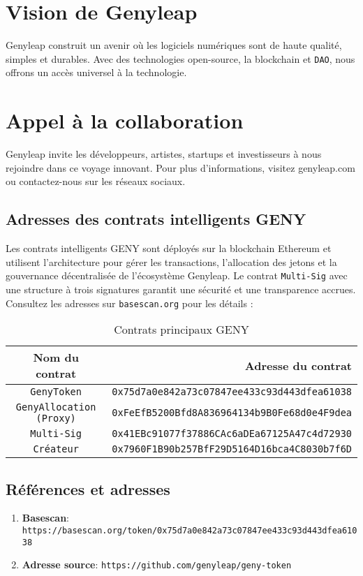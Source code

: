 \documentclass[a4paper,12pt,openany]{book}
\begin{document}
\chapter{Vision de Genyleap}
Genyleap construit un avenir où les logiciels numériques sont de haute qualité, simples et durables. Avec des technologies open-source, la blockchain et \texttt{DAO}, nous offrons un accès universel à la technologie.

\chapter{Appel à la collaboration}
Genyleap invite les développeurs, artistes, startups et investisseurs à nous rejoindre dans ce voyage innovant. Pour plus d'informations, visitez genyleap.com ou contactez-nous sur les réseaux sociaux.

\section*{Adresses des contrats intelligents GENY}
Les contrats intelligents GENY sont déployés sur la blockchain Ethereum et utilisent l'architecture  pour gérer les transactions, l'allocation des jetons et la gouvernance décentralisée de l'écosystème Genyleap. Le contrat \texttt{Multi-Sig} avec une structure à trois signatures garantit une sécurité et une transparence accrues. Consultez les adresses sur \texttt{basescan.org} pour les détails :

\begin{table}[h]
\centering
\caption*{Contrats principaux GENY}
\small
\begin{tabular}{c r}
\hline
\textbf{Nom du contrat} & \textbf{Adresse du contrat} \\
\hline
\texttt{GenyToken} & {\texttt{0x75d7a0e842a73c07847ee433c93d443dfea61038}} \\
\texttt{GenyAllocation (Proxy)} & {\texttt{0xFeEfB5200Bfd8A836964134b9B0Fe68d0e4F9dea}} \\
\texttt{Multi-Sig} & {\texttt{0x41EBc91077f37886CAc6aDEa67125A47c4d72930}} \\
\texttt{Créateur} & {\texttt{0x7960F1B90b257BfF29D5164D16bca4C8030b7f6D}} \\
\hline
\end{tabular}
\end{table}

\section*{Références et adresses}

\begin{enumerate}
    \item \textbf{Basescan}: \texttt{https://basescan.org/token/0x75d7a0e842a73c07847ee433c93d443dfea61038}
    \item \textbf{Adresse source}: \texttt{https://github.com/genyleap/geny-token}
\end{enumerate}
\end{document}
